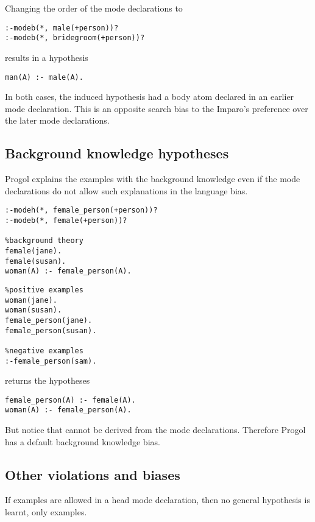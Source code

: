 Changing the order of the mode declarations to
\begin{lstlisting}
:-modeb(*, male(+person))?
:-modeb(*, bridegroom(+person))?
\end{lstlisting}
results in a hypothesis
\begin{lstlisting}
man(A) :- male(A).
\end{lstlisting}
In both cases, the induced hypothesis had a body atom declared in an earlier mode declaration. This is an opposite search bias to the Imparo's preference over the later mode declarations.

\subsection{Background knowledge hypotheses}\label{progol_background_knowledge_hypotheses}
Progol explains the examples with the background knowledge even if the mode declarations do not allow such explanations in the language bias.

\begin{minipage}[t]{.60\textwidth}
\begin{lstlisting}
:-modeh(*, female_person(+person))?
:-modeb(*, female(+person))?

%background theory
female(jane).
female(susan).
woman(A) :- female_person(A).
\end{lstlisting}
\end{minipage}
\begin{minipage}[t]{.20\textwidth}
\begin{lstlisting}
%positive examples
woman(jane).
woman(susan).
female_person(jane).
female_person(susan).

%negative examples
:-female_person(sam).
\end{lstlisting}
\end{minipage}

returns the hypotheses
\begin{lstlisting}
female_person(A) :- female(A).
woman(A) :- female_person(A).
\end{lstlisting}
But notice that  cannot be derived from the mode declarations. Therefore Progol has a default background knowledge bias.

\subsection{Other violations and biases}
If examples are allowed in a head mode declaration, then no general hypothesis is learnt, only examples.
